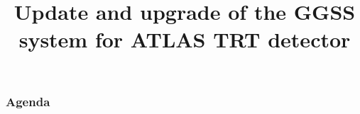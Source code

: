 \documentclass[10pt]{beamer}
\title{Update and upgrade of the GGSS system for ATLAS TRT detector}
\author{\normalsize{Arkadiusz Kasprzak \newline \and Jarosław Cierpich \newline \and Grzegorz Podsiadło \newline \newline \and Supervisor: Bartosz Mindur}}
\begin{document}
\titleframe[en]

\begin{frame}
\frametitle{Agenda}
\tableofcontents
\end{frame}
\end{document}
